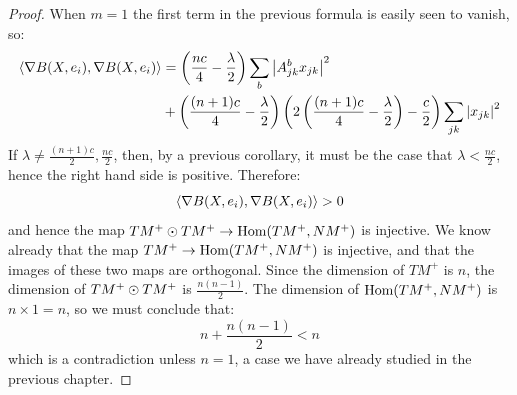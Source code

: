 \begin{proof} When $m=1$ the first term in the previous formula is easily seen to vanish, so:
%
\begin{align*}
\left\langle \nabla B (X, e_i), \nabla B(X, e_i) \right\rangle &= \left( \frac{nc}{4} - \frac{\lambda}{2} \right) \sum_{b} \left| A^b_{jk} x_{jk} \right|^2 \\
&+ \left( \frac{(n+1)c}{4} - \frac{\lambda}{2} \right) \left( 2 \left( \frac{(n+1)c}{4} - \frac{\lambda}{2} \right) - \frac{c}{2} \right) \sum_{jk} \left| x_{jk} \right|^2 \\
\end{align*}
If $\lambda \neq \frac{(n+1)c}{2}, \frac{nc}{2}$, then, by a previous corollary, it must be the case that $\lambda < \frac{nc}{2}$, hence the right hand side is positive.  Therefore:
%
$$ \left\langle \nabla B (X, e_i), \nabla B(X, e_i) \right\rangle > 0 $$
%
and hence the map $TM^{+} \odot TM^{+} \rightarrow \text{Hom}( TM^{+}, NM^+ )$ is injective.  We know already that the map $TM^{+} \rightarrow \text{Hom}( TM^{+}, NM^{+} )$ is injective, and that the images of these two maps are orthogonal.  Since the dimension of $TM^{+}$ is $n$, the dimension of $TM^{+} \odot TM^{+}$ is $\frac{n(n-1)}{2}$.  The dimension of $ \text{Hom} ( TM^{+}, NM^+ ) $ is $ n \times 1 = n$, so we must conclude that:
%
$$ n + \frac{n(n-1)}{2} < n $$
%
which is a contradiction unless $n=1$, a case we have already studied in the previous chapter.
\end{proof}
